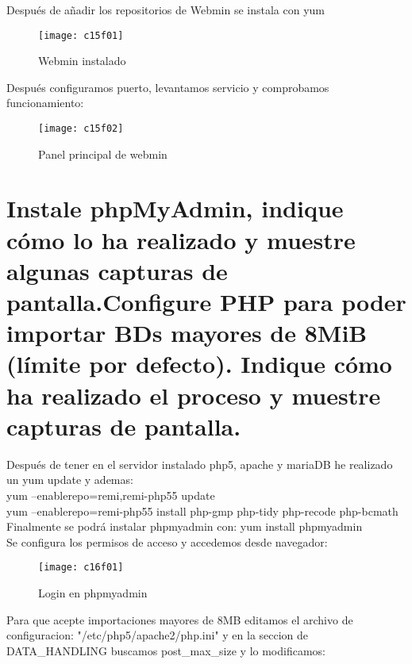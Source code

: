 Después de añadir los repositorios de Webmin se instala con yum \\

\begin{figure}[H]
	\centering
	\texttt{[image: c15f01]}
	\caption{Webmin instalado}
	\label{fig:c15f01}
\end{figure}



Después configuramos puerto, levantamos servicio y comprobamos funcionamiento: \\
	
\begin{figure}[H]
	\centering
	\texttt{[image: c15f02]}
	\caption{Panel principal de webmin}
	\label{fig:c15f02}
\end{figure}


\section{Instale phpMyAdmin, indique cómo lo ha realizado y muestre algunas capturas de pantalla.Configure PHP para poder importar BDs mayores de 8MiB (límite por defecto). Indique cómo ha realizado el proceso y muestre capturas de pantalla.}


Después de tener en el servidor instalado php5, apache y mariaDB he realizado un yum update y ademas: \\
yum --enablerepo=remi,remi-php55 update \\
yum --enablerepo=remi-php55 install php-gmp php-tidy php-recode php-bcmath \\

Finalmente se podrá instalar phpmyadmin con: yum install phpmyadmin \\
Se configura los permisos de acceso y accedemos desde navegador: \\
\begin{figure}[H]
	\centering
	\texttt{[image: c16f01]}
	\caption{Login en phpmyadmin}
	\label{fig:c16f01}
\end{figure}

Para que acepte importaciones mayores de 8MB editamos el archivo de configuracion: "/etc/php5/apache2/php.ini" y en la seccion de DATA\_HANDLING buscamos post\_max\_size y lo modificamos:\\

